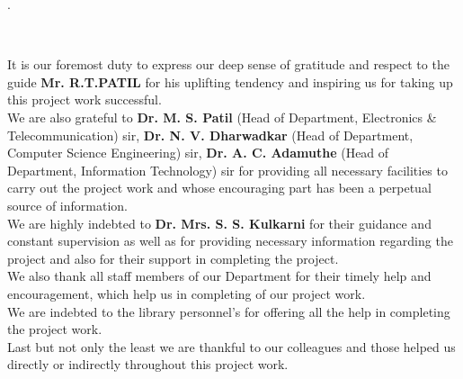 \documentclass[12pt,a4paper]{article}
\begin{document}

\newpage
\thispagestyle{empty}
\thisfancypage{
   \setlength{\fboxsep}{10pt}\doublebox}{} 
.\\
\vspace{0.4in}
\begin{center}
		\textbf{\large{}}\\
\end{center}
\vspace{0.5cm}
\hspace{1cm}It is our foremost duty to express our deep sense of gratitude and respect to the guide \textbf{ Mr. R.T.PATIL} for his uplifting tendency and inspiring us for taking up this project work successful.\\ 

\hspace{1cm} We are also grateful to \textbf{Dr. M. S. Patil} (Head of Department, Electronics \& Telecommunication) sir, \textbf{Dr. N. V. Dharwadkar} (Head of Department, Computer Science Engineering) sir, \textbf{Dr. A. C. Adamuthe} (Head of Department, Information Technology) sir for providing all necessary facilities to carry out the project work and whose encouraging part has been a perpetual source of information.\\ 

\hspace{1cm}We are highly indebted to \textbf{ Dr. Mrs. S. S. Kulkarni} for their guidance and constant supervision as well as for providing necessary information regarding the project and also for their support in completing the project.\\ 

\hspace{1cm}We also thank all staff members of our Department for their timely help and encouragement, which help us in completing of our project work.\\ 

\hspace{1cm}We are indebted to the library personnel’s for offering all the help in completing the project work.\\
 
\hspace{1cm}Last but not only the least we are thankful to our colleagues and those helped us directly or indirectly throughout this project work.\\
\end{document}
